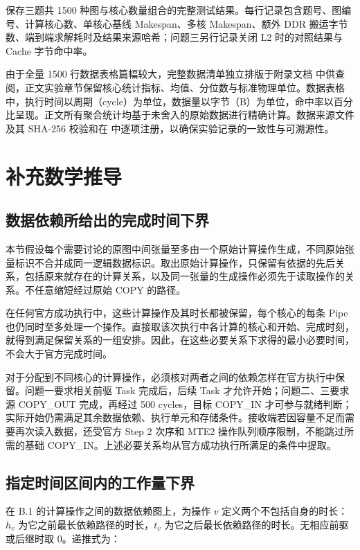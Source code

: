 \documentclass[anonymous,notoc]{gmcm2026}
\begin{document}
\texttt{} 保存三题共 1500 种图与核心数量组合的完整测试结果。每行记录包含题号、图编号、计算核心数、单核心基线 Makespan、多核 Makespan、额外 DDR 搬运字节数、端到端求解耗时及结果来源哈希；问题三另行记录关闭 L2 时的对照结果与 Cache 字节命中率。

由于全量 1500 行数据表格篇幅较大，完整数据清单独立排版于附录文档 \texttt{} 中供查阅，正文实验章节保留核心统计指标、均值、分位数与标准物理单位。数据表格中，执行时间以周期（cycle）为单位，数据量以字节（B）为单位，命中率以百分比呈现。正文所有聚合统计均基于未舍入的原始数据进行精确计算。数据来源文件及其 SHA-256 校验和在 \texttt{} 中逐项注册，以确保实验记录的一致性与可溯源性。

\section{补充数学推导}

\subsection{数据依赖所给出的完成时间下界}

本节假设每个需要讨论的原图中间张量至多由一个原始计算操作生成，不同原始张量标识不合并成同一逻辑数据标识。取出原始计算操作，只保留有依据的先后关系，包括原来就存在的计算关系，以及同一张量的生成操作必须先于读取操作的关系。不任意缩短经过原始 COPY 的路径。

在任何官方成功执行中，这些计算操作及其时长都被保留，每个核心的每条 Pipe 也仍同时至多处理一个操作。直接取该次执行中各计算的核心和开始、完成时刻，就得到满足保留关系的一组安排。因此，在这些必要关系下求得的最小必要时间，不会大于官方完成时间。

对于分配到不同核心的计算操作，必须核对两者之间的依赖怎样在官方执行中保留。问题一要求相关前驱 Task 完成后，后续 Task 才允许开始；问题二、三要求源 COPY\_OUT 完成，再经过 500 cycles，目标 COPY\_IN 才可参与就绪判断；实际开始仍需满足其余数据依赖、执行单元和存储条件。接收端若因容量不足而需要再次读入数据，还受官方 Step 2 次序和 MTE2 操作队列顺序限制，不能跳过所需的基础 COPY\_IN。上述必要关系均从官方成功执行所满足的条件中提取。

\subsection{指定时间区间内的工作量下界}

在 B.1 的计算操作之间的数据依赖图上，为操作 \(v\) 定义两个不包括自身的时长：\(h_v\) 为它之前最长依赖路径的时长，\(t_v\) 为它之后最长依赖路径的时长。无相应前驱或后继时取 0。递推式为：
\end{document}
